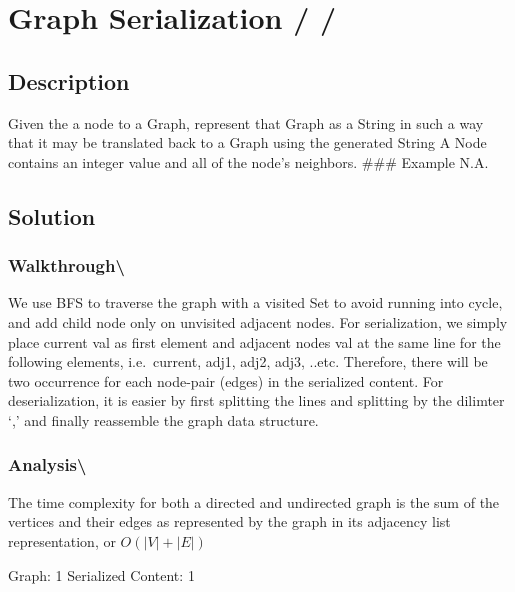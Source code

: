 \documentclass[]{book}
\newenvironment{Shaded}{\begin{snugshade}}{\end{snugshade}}
\newcommand{\DecValTok}[1]{\textcolor[rgb]{0.00,0.00,0.81}{#1}}
\newcommand{\NormalTok}[1]{#1}
\begin{document}
\hypertarget{graph-serialization}{%
\section{Graph Serialization / /}\label{graph-serialization}}

\hypertarget{description-80}{%
\subsection{Description}\label{description-80}}

Given the a node to a Graph, represent that Graph as a String in such a way that it may be translated back to a
Graph using the generated String A Node contains an integer value and all of the node's neighbors.
\#\#\# Example
N.A.

\hypertarget{solution-57}{%
\subsection{Solution}\label{solution-57}}

\hypertarget{walkthrough-91}{%
\subsubsection{Walkthrough\textbackslash{}}\label{walkthrough-91}}

We use BFS to traverse the graph with a visited Set to avoid running into cycle, and add child node only on unvisited
adjacent nodes. For serialization, we simply place current val as first element and adjacent nodes val at the same
line for the following elements, i.e.~current, adj1, adj2, adj3, ..etc. Therefore, there will be two occurrence
for each node-pair (edges) in the serialized content. For deserialization, it is easier by first splitting the lines
and splitting by the dilimter `,' and finally reassemble the graph data structure.

\hypertarget{analysis-98}{%
\subsubsection{Analysis\textbackslash{}}\label{analysis-98}}

The time complexity for both a directed and undirected graph is the sum of the vertices and
their edges as represented by the graph in its adjacency list representation, or \(O(|V| + |E|)\)

\begin{Shaded}
\begin{Highlighting}[]
\NormalTok{Graph:}
\DecValTok{1}
\NormalTok{Serialized Content:}
\DecValTok{1}
\end{Highlighting}
\end{Shaded}
\end{document}
